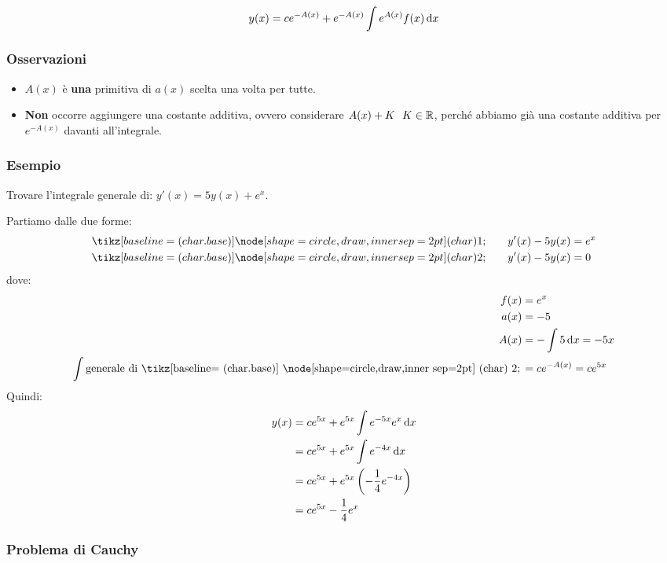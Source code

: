 \[
    y(x) = c e ^{-A(x)} + e ^{-A(x)} \int e^{A(x)} f(x) \mathop{}\!\mathrm{d} x
\]

\subsubsection*{Osservazioni}

\begin{itemize}
    \item \(A(x)\) è \textbf{una} primitiva di \(a(x)\) scelta una volta per tutte.
    \item \textbf{Non} occorre aggiungere una costante additiva, ovvero considerare \(A(x) + K\ \ K \in \mathbb{R} \), perché abbiamo già una costante additiva per \(e^{-A(x)}\) davanti all'integrale.
\end{itemize}

\subsubsection*{Esempio}

Trovare l'integrale generale di: \(y'(x) = 5y(x) + e^x\).

Partiamo dalle due forme:
\begin{align*}
    \circled{1} \qquad y'(x) - 5y(x) & = e^x \\
    \circled{2} \qquad y'(x) - 5y(x) & = 0
\end{align*}
dove:
\begin{align*}
    f(x)                                  & = e^x                    \\
    a(x)                                  & = -5                     \\
    A(x)                                  & = - \int 5 \diff x = -5x \\
    \int \text{generale di \circled{2}}\, & = ce^{-A(x)} = ce^{5x}
\end{align*}
Quindi:
\begin{align*}
    y(x) & = c e ^{5x} + e ^{5x} \int e ^{-5x} e^x \mathop{}\!\mathrm{d} x             \\
         & = c e ^{5x} + e ^{5x} \int e ^{-4x} \mathop{}\!\mathrm{d} x                 \\
         & = c e ^{5x} + e ^{5x} \left( - \frac{1}{4} e ^{-4x} \right) \\
         & = c e ^{5x} - \frac{1}{4} e ^{x}
\end{align*}

\newpage
\subsubsection{Problema di Cauchy}

